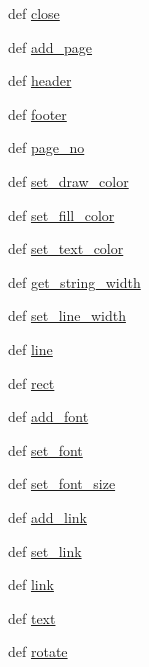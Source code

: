 \begin{DoxyCompactItemize}
def \hyperlink{namespacemmasgis_1_1fpdf_aef1f3147c15529f85ab5d7b5f4cab49c}{close}
\item 
def \hyperlink{namespacemmasgis_1_1fpdf_a736fa9a278935602145456610f4daee9}{add\_\-page}
\item 
def \hyperlink{namespacemmasgis_1_1fpdf_afb612d6c2675364b37d71c49ac38334e}{header}
\item 
def \hyperlink{namespacemmasgis_1_1fpdf_af45a680e725df7f7bf3d23579536ce3a}{footer}
\item 
def \hyperlink{namespacemmasgis_1_1fpdf_ab73345a126c1e649b5fb35114685a63d}{page\_\-no}
\item 
def \hyperlink{namespacemmasgis_1_1fpdf_a45068809f7d1d5a506fa2f32367a4441}{set\_\-draw\_\-color}
\item 
def \hyperlink{namespacemmasgis_1_1fpdf_ae63c98611d629cf0be466b7adeaf25ce}{set\_\-fill\_\-color}
\item 
def \hyperlink{namespacemmasgis_1_1fpdf_aa7cc6596565f93269fd3bd526deedac9}{set\_\-text\_\-color}
\item 
def \hyperlink{namespacemmasgis_1_1fpdf_adad4771c76c3e628b85171607edd1204}{get\_\-string\_\-width}
\item 
def \hyperlink{namespacemmasgis_1_1fpdf_a8b34c62df1b48e2ae4131d3329ce6766}{set\_\-line\_\-width}
\item 
def \hyperlink{namespacemmasgis_1_1fpdf_a98a32a1b14364fe1e31818cfa0d40452}{line}
\item 
def \hyperlink{namespacemmasgis_1_1fpdf_af0626a1647181c7324dfb8434c4e9f4d}{rect}
\item 
def \hyperlink{namespacemmasgis_1_1fpdf_afa76cacdb3c404c79b74f2afa1fd0e95}{add\_\-font}
\item 
def \hyperlink{namespacemmasgis_1_1fpdf_a50b4ad6188e510eec200acffc723384e}{set\_\-font}
\item 
def \hyperlink{namespacemmasgis_1_1fpdf_a87d021df46a9511a4059732f4b4eed2b}{set\_\-font\_\-size}
\item 
def \hyperlink{namespacemmasgis_1_1fpdf_a4e4a157d28c9fa8d13770b9656881eac}{add\_\-link}
\item 
def \hyperlink{namespacemmasgis_1_1fpdf_a32e0b1745c22f6b58781195565adf867}{set\_\-link}
\item 
def \hyperlink{namespacemmasgis_1_1fpdf_afbcdc95d3841cd3dac1cb92f55f4c781}{link}
\item 
def \hyperlink{namespacemmasgis_1_1fpdf_a11ce21f04a0f1ee59fecc0d59209166b}{text}
\item 
def \hyperlink{namespacemmasgis_1_1fpdf_adcd8d004a2916c0641192c01f4904741}{rotate}

\end{DoxyCompactItemize}
